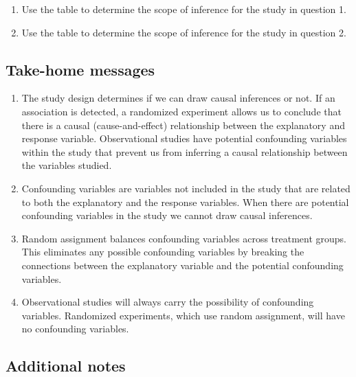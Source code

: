 \documentclass[
]{report}
\begin{document}
\begin{enumerate}
\def\labelenumi{\arabic{enumi}.}
\setcounter{enumi}{18}
\item
  Use the table to determine the scope of inference for the study in question 1.
  \vspace{0.3in}
\item
  Use the table to determine the scope of inference for the study in question 2.
  \vspace{0.3in}
\end{enumerate}

\hypertarget{take-home-messages-3}{%
\subsection{Take-home messages}\label{take-home-messages-3}}

\begin{enumerate}
\def\labelenumi{\arabic{enumi}.}
\item
  The study design determines if we can draw causal inferences or not. If an association is detected, a randomized experiment allows us to conclude that there is a causal (cause-and-effect) relationship between the explanatory and response variable. Observational studies have potential confounding variables within the study that prevent us from inferring a causal relationship between the variables studied.
\item
  Confounding variables are variables not included in the study that are related to both the explanatory and the response variables. When there are potential confounding variables in the study we cannot draw causal inferences.
\item
  Random assignment balances confounding variables across treatment groups. This eliminates any possible confounding variables by breaking the connections between the explanatory variable and the potential confounding variables.
\item
  Observational studies will always carry the possibility of confounding variables. Randomized experiments, which use random assignment, will have no confounding variables.
\end{enumerate}

\newpage

\hypertarget{additional-notes-3}{%
\subsection{Additional notes}\label{additional-notes-3}}
\end{document}
